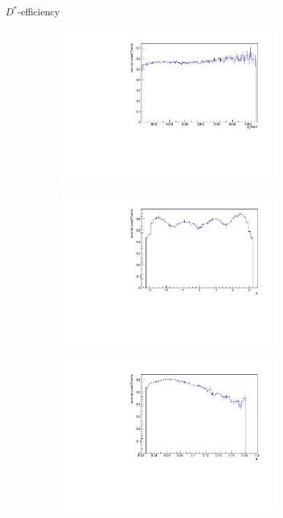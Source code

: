 \documentclass[11pt]{beamer}
\begin{document}
\begin{frame}{$D^*$-efficiency}
\begin{figure}
\begin{subfigure}{0.45\textwidth}
\includegraphics[width=0.9\textwidth]{up_pdf/neg/h_pt_reco_Dst_neg.pdf}
\end{subfigure}
\begin{subfigure}{0.45\textwidth}
\includegraphics[width=0.9\textwidth]{up_pdf/neg/h_phi_reco_Dst_neg.pdf}
\end{subfigure}
\begin{subfigure}{0.45\textwidth}
\includegraphics[width=0.9\textwidth]{up_pdf/neg/h_theta_reco_Dst_neg.pdf}

\end{subfigure}
\end{figure}
\end{frame}
\end{document}
